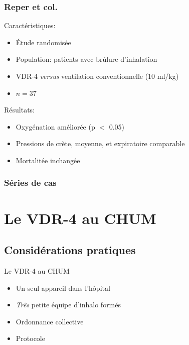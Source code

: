\documentclass[aspectratio=169]{beamer}
\begin{document}
\begin{frame}
	\centering
	
\end{frame}

\begin{frame}
	\frametitle{Reper et col.}

	\begin{block}{Caractéristiques:}

	\begin{itemize}
		\item Étude randomisée
		\item Population: patients avec brûlure d'inhalation
		\item VDR-4 \textit{versus} ventilation conventionnelle (10 ml/kg)
		\item $n=37$
	\end{itemize}
	\end{block}

	\begin{block}{Résultats:}

	\begin{itemize}
		\item Oxygénation améliorée (p $<$ 0.05)
		\item Pressions de crète, moyenne, et expiratoire comparable
		\item Mortalitée inchangée
	\end{itemize}
	\end{block}

\end{frame}

\begin{frame}
	\centering
	
\end{frame}

\begin{frame}
	\frametitle{Séries de cas}
	
\end{frame}

\section{Le VDR-4 au CHUM}

\subsection{Considérations pratiques}

\begin{frame}{Le VDR-4 au CHUM}
	\begin{itemize}
		\item Un seul appareil dans l'hôpital
		\item {\em Três} petite équipe d'inhalo formés
		\item Ordonnance collective
		\item Protocole
	\end{itemize}
\end{frame}
\end{document}
